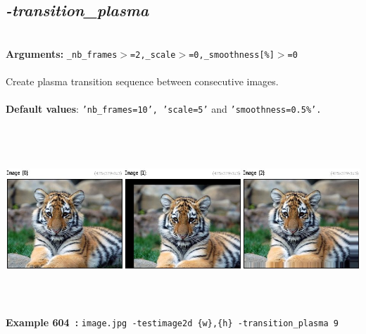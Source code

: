 \documentclass[a4paper,11pt,twoside]{book}
\begin{document}
\subsection{\emph{-transition\_plasma} }\vspace*{-0.5em}
~\\\textbf{Arguments: } 
{\small \texttt{\_nb\_frames$>$=2,\_scale$>$=0,\_smoothness[\%]$>$=0}}\\~\\
Create plasma transition sequence between consecutive images.
~\\~\\\textbf{Default values}: {\small \texttt{'nb\_frames=10', 'scale=5'} and \texttt{'smoothness=0.5\%'.}}
\begin{center}\includegraphics[keepaspectratio=true,height=7cm,width=\textwidth]{img/gmic_def604.jpg}\\
{\footnotesize \textbf{Example 604~:} \texttt{image.jpg -testimage2d \{w\},\{h\} -transition\_plasma 9}}
\end{center}
\end{document}
